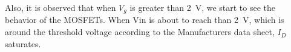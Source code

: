 \documentclass[journal]{IEEEtran}
\begin{document}
\par Also, it is observed that when $V_{g}$ is greater than \SI{2}{\volt},
we start to see the behavior of the MOSFETs. When Vin is about to reach than
\SI{2}{\volt}, which is around the  threshold voltage according to the Manufacturers data sheet,
$I_{D}$ saturates.
\clearpage
\end{document}
